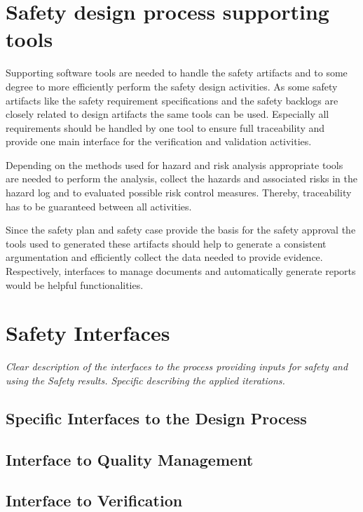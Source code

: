 \documentclass{template/openetcs_report}
\begin{document}
\section{Safety design process supporting tools}

Supporting software tools are needed to handle the safety artifacts and to some degree to more efficiently perform the safety design activities. As some safety artifacts like the safety requirement specifications and the safety backlogs are closely related to design artifacts the same tools can be used. Especially all requirements should be handled by one tool to ensure full traceability and provide one main interface for the verification and validation activities.

Depending on the methods used for hazard and risk analysis appropriate tools are needed to perform the analysis, collect the hazards and associated risks in the hazard log and to evaluated possible risk control measures. Thereby, traceability has to be guaranteed between all activities.

Since the safety plan and safety case provide the basis for the safety approval the tools used to generated these artifacts should help to generate a consistent argumentation and efficiently collect the data needed to provide evidence. Respectively, interfaces to manage documents and automatically generate reports would be helpful functionalities.

\section{Safety Interfaces}

\textit{Clear description of the interfaces to the process providing inputs for safety and using the Safety results. Specific describing the applied iterations.}

\subsection{Specific Interfaces to the Design Process}

\subsection{Interface to Quality Management}

\subsection{Interface to Verification}
\end{document}
